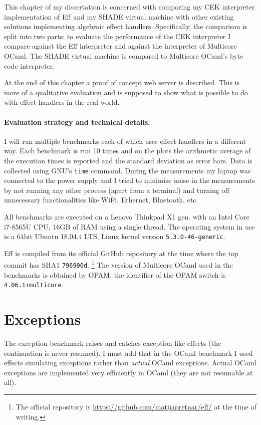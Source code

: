 \documentclass[class=article, crop=false]{standalone}
\begin{document}
This chapter of my dissertation is concerned with comparing my CEK interpreter
implementation of Eff and my SHADE virtual machine with other existing solutions
implementing algebraic effect handlers. Specifically, the comparison is split
into two parts: to evaluate the performance of the CEK interpreter I compare
against the Eff interpreter and against the interpreter of Multicore OCaml.
The SHADE virtual machine is compared to Multicore OCaml's byte code interpreter.

At the end of this chapter a proof of concept web server is described. This is
more of a qualitative evaluation and is supposed to show what is possible to do
with effect handlers in the real-world.

\paragraph{Evaluation strategy and technical details.}

I will run multiple benchmarks each of which uses effect handlers in a different
way. Each benchmark is run 10 times and on the plots the arithmetic average of
the execution times is reported and the standard deviation as error bars. Data is
collected using GNU's \verb|time| command. During the measurements my laptop was
connected to the power supply and I tried to minimise noise in the measurements
by not running any other process (apart from a terminal) and turning off
unnecessary functionalities like WiFi, Ethernet, Bluetooth, etc.

All benchmarks are executed on a Lenovo Thinkpad X1  gen. with an Intel
Core i7-8565U CPU, 16GB of RAM using a single thread. The operating system in
use is a 64bit Ubuntu 18.04.4 LTS, Linux kernel version \verb|5.3.0-46-generic|.

Eff is compiled from its official GitHub repository at the time where the top
commit has SHA1 \verb|796900d|.
\footnote{The official repository is
\url{https://github.com/matijapretnar/eff/} at the time of writing.}
The version of Multicore OCaml used in the benchmarks is obtained by OPAM, the
identifier of the OPAM switch is \verb|4.06.1+multicore|.

\section{Exceptions}

The exception benchmark raises and catches exception-like effects (the
continuation is never resumed). I must add that in the OCaml benchmark I used
effects simulating exceptions rather than \emph{actual} OCaml exceptions. Actual
OCaml exceptions are implemented very efficiently in OCaml (they are not
resumable at all).
\end{document}
